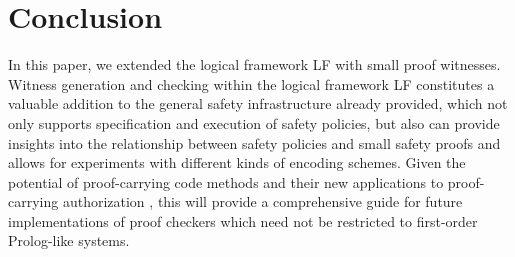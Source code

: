 \documentclass{llncs}
\begin{document}

\section{Conclusion}
In this paper, we extended the logical framework LF with small proof
witnesses. Witness generation and checking within the logical
framework LF constitutes a valuable addition to the general safety
infrastructure already provided, which not only supports specification
and execution of safety policies, but also can provide insights into
the relationship between safety policies and small safety proofs and
allows for experiments with different kinds of encoding schemes.
Given the potential of proof-carrying code methods and their new
applications to proof-carrying authorization
\cite{AppelFelten99,bauer:thesis}, this will provide a comprehensive
guide for future implementations of proof checkers which need not be
restricted to first-order Prolog-like systems.





\end{document}
